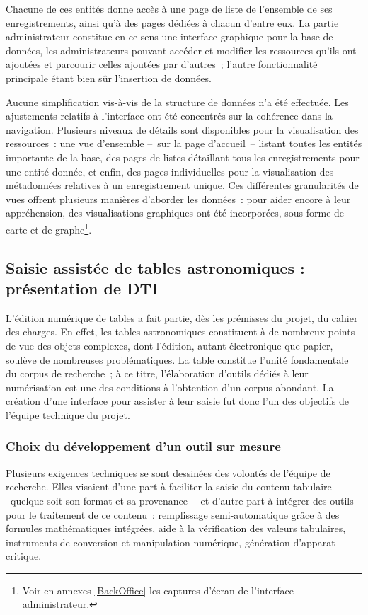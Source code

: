 \documentclass[a4paper,12pt,twoside]{book}
\begin{document}
Chacune de ces entités donne accès à une page de liste de l'ensemble de ses enregistrements, ainsi qu'à des pages dédiées à chacun d'entre eux. La partie administrateur constitue en ce sens une interface graphique pour la base de données, les administrateurs pouvant accéder et modifier les ressources qu'ils ont ajoutées et parcourir celles ajoutées par d'autres~; l'autre fonctionnalité principale étant bien sûr l'insertion de données.

Aucune simplification vis-à-vis de la structure de données n'a été effectuée. Les ajustements relatifs à l'interface ont été concentrés sur la cohérence dans la navigation. Plusieurs niveaux de détails sont disponibles pour la visualisation des ressources~: une vue d'ensemble –~sur la page d'accueil~– listant toutes les entités importante de la base, des pages de listes détaillant tous les enregistrements pour une entité donnée, et enfin, des pages individuelles pour la visualisation des métadonnées relatives à un enregistrement unique. Ces différentes granularités de vues offrent plusieurs manières d'aborder les données~: pour aider encore à leur appréhension, des visualisations graphiques ont été incorporées, sous forme de carte et de graphe\footnote{Voir en annexes \ref{BackOffice}\xspace les captures d'écran de l'interface administrateur.}.

		\subsection{\label{DTI}Saisie assistée de tables astronomiques : présentation de DTI}
L'édition numérique de tables a fait partie, dès les prémisses du projet, du cahier des charges. En effet, les tables astronomiques constituent à de nombreux points de vue des objets complexes, dont l'édition, autant électronique que papier, soulève de nombreuses problématiques. La table constitue l'unité fondamentale du corpus de recherche~; à ce titre, l'élaboration d'outils dédiés à leur numérisation est une des conditions à l'obtention d'un corpus abondant. La création d'une interface pour assister à leur saisie fut donc l'un des objectifs de l'équipe technique du projet.

			\subsubsection{Choix du développement d'un outil sur mesure}
Plusieurs exigences techniques se sont dessinées des volontés de l'équipe de recherche. Elles visaient d'une part à faciliter la saisie du contenu tabulaire –~quelque soit son format et sa provenance~– et d'autre part à intégrer des outils pour le traitement de ce contenu~: remplissage semi-automatique grâce à des formules mathématiques intégrées, aide à la vérification des valeurs tabulaires, instruments de conversion et manipulation numérique, génération d'apparat critique.
\end{document}
